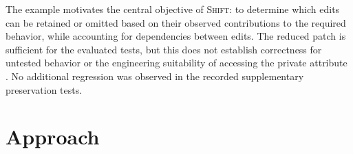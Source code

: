 \documentclass[a4paper,fleqn]{cas-sc}
\newcommand{\tool}{\textsc{Shift}}
\newcommand{\code}[1]{\texttt{\detokenize{#1}}}
\begin{document}
The example motivates the central objective of \tool{}:
to determine which edits can be retained or omitted based on
their observed contributions to the required behavior, while
accounting for dependencies between edits. The reduced patch
is sufficient for the evaluated tests, but this does not
establish correctness for untested behavior or the engineering
suitability of accessing the private attribute
\code{_wrapped}. No additional regression was observed in the
recorded supplementary preservation tests.

















\section{Approach}\label{sec:approach}
\end{document}
